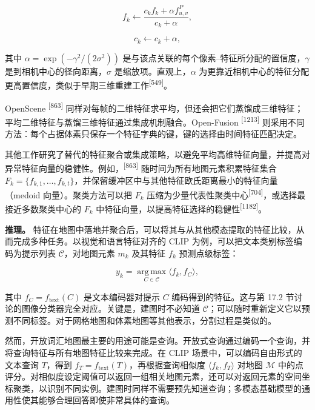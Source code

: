 \begin{equation}
f_k\leftarrow\frac{c_kf_k+\alpha f^P_{u,v}}{c_k+\alpha},\tag{17.2}
\end{equation}

\begin{equation}
c_k\leftarrow c_k+\alpha,\tag{17.3}
\end{equation}

其中 $\alpha=\exp(-\gamma^2/(2\sigma^2))$ 是与该点关联的每个像素--特征所分配的置信度，$\gamma$ 是到相机中心的径向距离，$\sigma$ 是缩放项。直观上，$\alpha$ 为更靠近相机中心的特征分配更高置信度，类似于早期三维重建工作\textsuperscript{[549]}。

OpenScene \textsuperscript{[863]} 同样对每帧的二维特征求平均，但还会把它们蒸馏成三维特征；平均二维特征与蒸馏三维特征通过集成机制融合。Open-Fusion \textsuperscript{[1213]} 则采用不同方法：每个占据体素只保存一个特征字典的键，键的选择由时间特征匹配决定。

其他工作研究了替代的特征聚合或集成策略，以避免平均高维特征向量，并提高对异常特征向量的稳健性。例如，\textsuperscript{[863]} 随时间为所有地图元素积累特征集合 $F_k=\{f_{k,1},\ldots,f_{k,t}\}$，并保留缓冲区中与其他特征欧氏距离最小的特征向量（medoid 向量）。聚类方法可以把 $F_k$ 压缩为少量代表性聚类中心\textsuperscript{[704]}，或选择最接近多数聚类中心的 $F_k$ 中特征向量，以提高特征选择的稳健性\textsuperscript{[1182]}。

\textbf{推理。} 特征在地图中落地并聚合后，可以将其与从其他模态提取的特征比较，从而完成多种任务。以视觉和语言特征对齐的 CLIP 为例，可以把文本类别标签编码为提示列表 $\mathcal{C}$，对地图元素 $m_k$ 及其特征 $f_k$ 预测点级标签：

\begin{equation}
y_k=\operatorname*{arg\,max}_{C\in\mathcal{C}}\langle f_k,f_C\rangle,\tag{17.4}
\end{equation}

其中 $f_C=f_{\mathrm{text}}(C)$ 是文本编码器对提示 $C$ 编码得到的特征。这与第 17.2 节讨论的图像分类器完全对应。关键是，建图时不必知道 $\mathcal{C}$；可以随时重新定义它以预测不同标签。对于网格地图和体素地图等其他表示，分割过程是类似的。

然而，开放词汇地图最主要的用途可能是查询。开放式查询通过编码一个查询，并将查询特征与所有地图特征比较来完成。在 CLIP 场景中，可以编码自由形式的文本查询 $T$，得到 $f_T=f_{\mathrm{text}}(T)$，再根据查询相似度 $\langle f_k,f_T\rangle$ 对地图 $\mathcal{M}$ 中的点评分。对相似度设定阈值可以返回一组相关地图元素，还可以对返回元素的空间坐标聚类，以识别不同实例。建图时同样不需要预先知道查询；多模态基础模型的通用性使其能够合理回答即使非常具体的查询。

